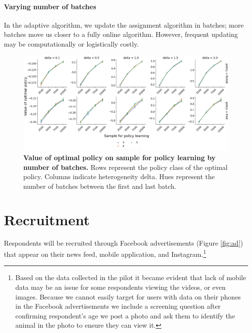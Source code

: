 \documentclass[letterpaper, 12pt, parskip=full,DIV=10]{scrartcl}
\begin{document}
\paragraph{Varying number of batches}
In the adaptive algorithm, we update the assignment algorithm in batches; more batches move us closer to a fully online algorithm. However, frequent updating may be computationally or logistically costly. %

\begin{figure}[H]
\centering
\includegraphics[width=\textwidth]{figures/value_opt_num_batches.png}
\caption{\textbf{Value of optimal policy on sample for policy learning by number of batches. }
Rows represent the policy class of the optimal policy.  Columns indicate heterogeneity delta. 
Hues represent the number of batches between the first and last batch.}
\label{fig:value_num_batches}
\end{figure}





\clearpage










\clearpage







\appendix

\section{Recruitment}\label{appendix:recruitment}Respondents will be recruited through Facebook advertisements (Figure \ref{fig:ad}) that appear on their news feed, mobile application, and Instagram.\footnote{ {Based on the data collected in the pilot it became evident that lack of mobile data may be an issue for some respondents viewing the videos, or even images. Because we cannot easily target for users with data on their phones in the Facebook advertisements we include a screening question after confirming respondent's age we post a photo and ask them to identify the animal in the photo to ensure they can view it.} }
\end{document}
